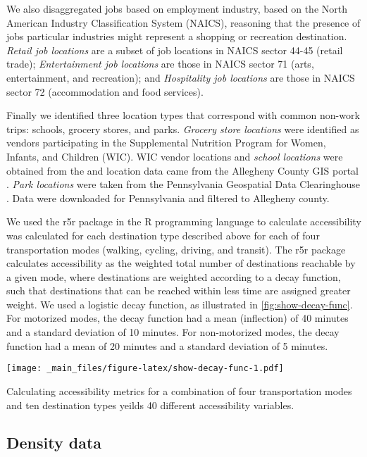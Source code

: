 \documentclass[
]{book}
\theoremstyle{definition}
\theoremstyle{definition}
\theoremstyle{definition}
\theoremstyle{definition}
\theoremstyle{remark}
\begin{document}
We also disaggregated jobs based on employment industry, based on the North
American Industry Classification System (NAICS), reasoning that the presence of
jobs particular industries might represent a shopping or recreation destination.
\emph{Retail job locations} are a subset of job locations in NAICS sector 44-45
(retail trade); \emph{Entertainment job locations} are those in NAICS sector 71
(arts, entertainment, and recreation); and \emph{Hospitality job locations} are
those in NAICS sector 72 (accommodation and food services).

Finally we identified three location types that correspond with common non-work
trips: schools, grocery stores, and parks. \emph{Grocery store locations} were
identified as vendors participating in the Supplemental Nutrition Program for
Women, Infants, and Children (WIC). WIC vendor locations and \emph{school locations}
were obtained from the and location data came from the Allegheny County GIS portal
\citep{allegheny_county_office_of_information_technology_allegheny_2018, allegheny_county_office_of_information_technology_allegheny_2020}.
\emph{Park locations} were taken from the Pennsylvania Geospatial Data Clearinghouse
\citep{pennsylvania_department_of_conservation_and_natural_resources_pennsylvania_2015}.
Data were downloaded for Pennsylvania and filtered to Allegheny county.

We used the r5r package in the R programming language \citep{pereira_r5r_2021} to
calculate accessibility was calculated for each destination type described above
for each of four transportation modes (walking, cycling, driving, and transit).
The r5r package calculates accessibility as the weighted total number of
destinations reachable by a given mode, where destinations are weighted
according to a decay function, such that destinations that can be reached within
less time are assigned greater weight. We used a logistic decay function, as
illustrated in \ref{fig:show-decay-func}. For motorized modes, the decay
function had a mean (inflection) of 40 minutes and a standard deviation of 10
minutes. For non-motorized modes, the decay function had a mean of 20 minutes
and a standard deviation of 5 minutes.

\texttt{[image: \_main\_files/figure-latex/show-decay-func-1.pdf]}

Calculating accessibility metrics for a combination of four transportation modes
and ten destination types yeilds 40 different accessibility variables.

\hypertarget{density-data}{%
\subsection{Density data}\label{density-data}}
\end{document}
